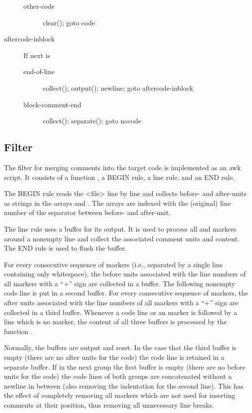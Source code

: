 \begin{description}
\begin{description}
  \item[other-code] clear(); goto code
  \end{description}
\item[aftercode-inblock] If next is
  \begin{description}
  \item[end-of-line] collect(); output(); newline; goto aftercode-inblock
  \item[block-comment-end] collect(); separate(); goto nocode
  \end{description}
\end{description}

\subsection{Filter }

The filter for merging comments into the target code is implemented as an awk script. It consists of a function 
, a BEGIN rule, a line rule, and an END rule. 

The BEGIN rule reads the <file> line by line and collects before- and after-units as strings in the arrays  and . The arrays are indexed with the (original) line number of the separator between before- and after-unit.

The line rule uses a buffer for its output. It is used to process all  and  markers around
a nonempty line and collect the associated comment units and content. The END rule is used to flush the buffer.

For every consecutive sequence of  markers (i.e., separated by a single line containing only whitespace),
the before units associated with the line numbers of all markers with 
a ``+'' sign are collected in a buffer. The following nonempty code line is put in a second buffer. 
For every consecutive sequence of  markers, the after units associated with the line numbers of all 
markers with a ``+'' sign are collected in a third buffer. Whenever a code line or an  marker is 
followed by a line which is no  marker, the content of all three buffers is processed by the 
function .

Normally, the buffers are output and reset. In the case that the third buffer is empty (there are no after 
units for the code) the code line is retained in a separate buffer. If in the next group the first buffer is 
empty (there are no before units for the code) the code lines of both groups are concatenated without a newline 
in between (also removing the indentation for the second line). This has the effect of completely removing all 
markers which are not used for inserting comments at their position, thus removing all unnecessary line breaks.

